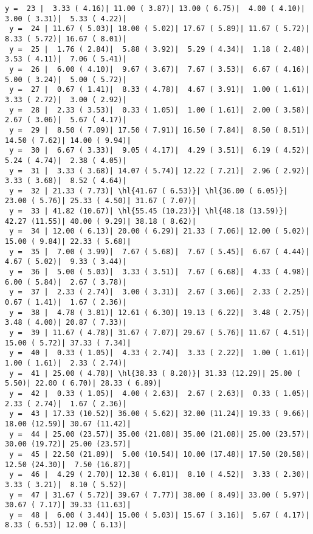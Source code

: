 \documentclass[10pt]{article}
\newcommand{\hl}[1]{\textbf{\textcolor{red}{#1}}}
\begin{document}
\begin{Verbatim}[fontsize=\small, commandchars=\\\{\}]
 y =  23 |  3.33 ( 4.16)| 11.00 ( 3.87)| 13.00 ( 6.75)|  4.00 ( 4.10)|  3.00 ( 3.31)|  5.33 ( 4.22)|
 y =  24 | 11.67 ( 5.03)| 18.00 ( 5.02)| 17.67 ( 5.89)| 11.67 ( 5.72)|  8.33 ( 5.72)| 16.67 ( 8.01)|
 y =  25 |  1.76 ( 2.84)|  5.88 ( 3.92)|  5.29 ( 4.34)|  1.18 ( 2.48)|  3.53 ( 4.11)|  7.06 ( 5.41)|
 y =  26 |  6.00 ( 4.10)|  9.67 ( 3.67)|  7.67 ( 3.53)|  6.67 ( 4.16)|  5.00 ( 3.24)|  5.00 ( 5.72)|
 y =  27 |  0.67 ( 1.41)|  8.33 ( 4.78)|  4.67 ( 3.91)|  1.00 ( 1.61)|  3.33 ( 2.72)|  3.00 ( 2.92)|
 y =  28 |  2.33 ( 3.53)|  0.33 ( 1.05)|  1.00 ( 1.61)|  2.00 ( 3.58)|  2.67 ( 3.06)|  5.67 ( 4.17)|
 y =  29 |  8.50 ( 7.09)| 17.50 ( 7.91)| 16.50 ( 7.84)|  8.50 ( 8.51)| 14.50 ( 7.62)| 14.00 ( 9.94)|
 y =  30 |  6.67 ( 3.33)|  9.05 ( 4.17)|  4.29 ( 3.51)|  6.19 ( 4.52)|  5.24 ( 4.74)|  2.38 ( 4.05)|
 y =  31 |  3.33 ( 3.68)| 14.07 ( 5.74)| 12.22 ( 7.21)|  2.96 ( 2.92)|  3.33 ( 3.68)|  8.52 ( 4.64)|
 y =  32 | 21.33 ( 7.73)| \hl{41.67 ( 6.53)}| \hl{36.00 ( 6.05)}| 23.00 ( 5.76)| 25.33 ( 4.50)| 31.67 ( 7.07)|
 y =  33 | 41.82 (10.67)| \hl{55.45 (10.23)}| \hl{48.18 (13.59)}| 42.27 (11.55)| 40.00 ( 9.29)| 38.18 ( 8.62)|
 y =  34 | 12.00 ( 6.13)| 20.00 ( 6.29)| 21.33 ( 7.06)| 12.00 ( 5.02)| 15.00 ( 9.84)| 22.33 ( 5.68)|
 y =  35 |  7.00 ( 3.99)|  7.67 ( 5.68)|  7.67 ( 5.45)|  6.67 ( 4.44)|  4.67 ( 5.02)|  9.33 ( 3.44)|
 y =  36 |  5.00 ( 5.03)|  3.33 ( 3.51)|  7.67 ( 6.68)|  4.33 ( 4.98)|  6.00 ( 5.84)|  2.67 ( 3.78)|
 y =  37 |  2.33 ( 2.74)|  3.00 ( 3.31)|  2.67 ( 3.06)|  2.33 ( 2.25)|  0.67 ( 1.41)|  1.67 ( 2.36)|
 y =  38 |  4.78 ( 3.81)| 12.61 ( 6.30)| 19.13 ( 6.22)|  3.48 ( 2.75)|  3.48 ( 4.00)| 20.87 ( 7.33)|
 y =  39 | 11.67 ( 4.78)| 31.67 ( 7.07)| 29.67 ( 5.76)| 11.67 ( 4.51)| 15.00 ( 5.72)| 37.33 ( 7.34)|
 y =  40 |  0.33 ( 1.05)|  4.33 ( 2.74)|  3.33 ( 2.22)|  1.00 ( 1.61)|  1.00 ( 1.61)|  2.33 ( 2.74)|
 y =  41 | 25.00 ( 4.78)| \hl{38.33 ( 8.20)}| 31.33 (12.29)| 25.00 ( 5.50)| 22.00 ( 6.70)| 28.33 ( 6.89)|
 y =  42 |  0.33 ( 1.05)|  4.00 ( 2.63)|  2.67 ( 2.63)|  0.33 ( 1.05)|  2.33 ( 2.74)|  1.67 ( 2.36)|
 y =  43 | 17.33 (10.52)| 36.00 ( 5.62)| 32.00 (11.24)| 19.33 ( 9.66)| 18.00 (12.59)| 30.67 (11.42)|
 y =  44 | 25.00 (23.57)| 35.00 (21.08)| 35.00 (21.08)| 25.00 (23.57)| 30.00 (19.72)| 25.00 (23.57)|
 y =  45 | 22.50 (21.89)|  5.00 (10.54)| 10.00 (17.48)| 17.50 (20.58)| 12.50 (24.30)|  7.50 (16.87)|
 y =  46 |  4.29 ( 2.70)| 12.38 ( 6.81)|  8.10 ( 4.52)|  3.33 ( 2.30)|  3.33 ( 3.21)|  8.10 ( 5.52)|
 y =  47 | 31.67 ( 5.72)| 39.67 ( 7.77)| 38.00 ( 8.49)| 33.00 ( 5.97)| 30.67 ( 7.17)| 39.33 (11.63)|
 y =  48 |  6.00 ( 3.44)| 15.00 ( 5.03)| 15.67 ( 3.16)|  5.67 ( 4.17)|  8.33 ( 6.53)| 12.00 ( 6.13)|

\end{Verbatim}
\end{document}
